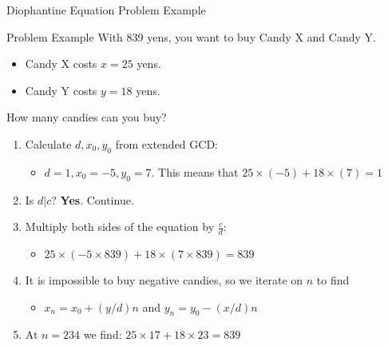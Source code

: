 \begin{frame}{Diophantine Equation Problem Example}
    \begin{block}{Problem Example}
      With 839 yens, you want to buy Candy X and Candy Y.
      \begin{itemize}
        \item Candy X costs $x=25$ yens.
        \item Candy Y costs $y=18$ yens.
      \end{itemize}
      How many candies can you buy?
    \end{block}

    \begin{enumerate}
      \item Calculate $d, x_0, y_0$ from extended GCD:
      \begin{itemize}
        \item $d = 1, x_0 = -5, y_0 = 7$. This means that $25\times(-5) + 18\times(7) = 1$
      \end{itemize}
      \item Is $d|c$? {\bf Yes}. Continue.
      \item Multiply both sides of the equation by $\frac{c}{d}$:
      \begin{itemize}
        \item $25 \times (-5 \times 839) + 18\times(7 \times 839) = 839$
      \end{itemize}
      \item It is impossible to buy negative candies, so we iterate on $n$ to find
      \begin{itemize}
        \item $x_n = x_0 + (y/d)n$ and $y_n = y_0 - (x/d)n$
      \end{itemize}
      \item At $n = 234$ we find: $25 \times 17 + 18 \times 23 = 839$
    \end{enumerate}
\end{frame}


